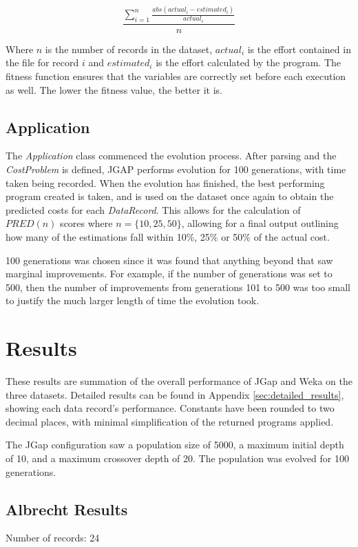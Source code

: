 \documentclass[11pt, a4paper]{article}
\begin{document}
\[\frac{\sum_{i = 1}^{n} \frac{abs(actual_i - estimated_i)}{actual_i}}{n}\]

Where \(n\) is the number of records in the dataset, \(actual_i\) is the effort
contained in the file for record \(i\) and \(estimated_i\) is the effort
calculated by the program. The fitness function ensures that the variables
are correctly set before each execution as well. The lower the fitness value,
the better it is.

\subsection{Application} %
\label{sub:application}
The \emph{Application} class commenced the evolution process. After parsing and
the \emph{CostProblem} is defined, JGAP performs evolution for 100 generations,
with time taken being recorded. When the evolution has finished, the best
performing program created is taken, and is used on the dataset once again to
obtain the predicted costs for each \emph{DataRecord}. This allows for the
calculation of \(PRED(n)\) scores where \(n = \{10, 25, 50\}\), allowing for a
final output outlining how many of the estimations fall within 10\%, 25\% or
50\% of the actual cost.

100 generations was chosen since it was found that anything beyond that saw
marginal improvements. For example, if the number of generations was set to 500,
then the number of improvements from generations 101 to 500 was too small to
justify the much larger length of time the evolution took.

\section{Results} %
\label{sec:results}
These results are summation of the overall performance of JGap and Weka on the
three datasets. Detailed results can be found in Appendix
\ref{sec:detailed_results}, showing each data record's performance.
Constants have been rounded to two decimal places, with minimal simplification
of the returned programs applied.

The JGap configuration saw a population size of 5000, a maximum initial depth of
10, and a maximum crossover depth of 20. The population was evolved for 100
generations.

\subsection{Albrecht Results} %
\label{sub:albrecht_results}
Number of records: 24
\end{document}
